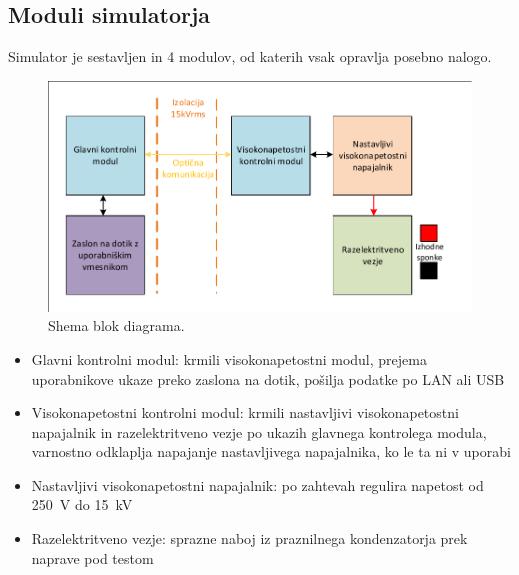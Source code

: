\documentclass[a4paper,twoside,openright,12pt,slovene]{book}
\begin{document}
	\subsection{Moduli simulatorja}
	Simulator je sestavljen in 4 modulov, od katerih vsak opravlja posebno nalogo.
	\begin{figure}[h]
    \centering
    \includegraphics[width=1\columnwidth]{Sheme/Osnovna blok shema poenostavljena.pdf}
    \caption{\label{BlokDiagramShema} Shema blok diagrama.}
	\end{figure}
	
	\begin{itemize}
		\item Glavni kontrolni modul: krmili visokonapetostni modul, prejema uporabnikove ukaze preko zaslona na dotik, pošilja podatke po LAN ali USB
		\item Visokonapetostni kontrolni modul: krmili nastavljivi visokonapetostni napajalnik in razelektritveno vezje po ukazih glavnega kontrolega modula, varnostno odklaplja napajanje nastavljivega napajalnika, ko le ta ni v uporabi
		\item Nastavljivi visokonapetostni napajalnik: po zahtevah regulira napetost od \SI{250}{\volt} do \SI{15}{\kilo\volt}
		\item Razelektritveno vezje: sprazne naboj iz praznilnega kondenzatorja prek naprave pod testom
	\end{itemize}
\end{document}
